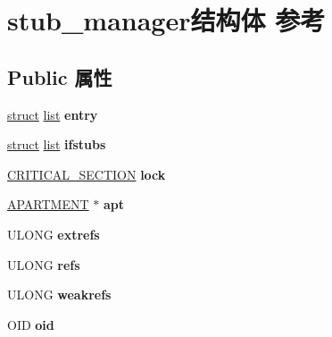 \hypertarget{structstub__manager}{}\section{stub\+\_\+manager结构体 参考}
\label{structstub__manager}
\subsection*{Public 属性}
\begin{DoxyCompactItemize}
\item 
\mbox{\label{structstub__manager_af73dcf9b53a5de15dfb5a33bc3ff68c3}} 
\hyperlink{interfacestruct}{struct} \hyperlink{classlist}{list} {\bfseries entry}
\item 
\mbox{\label{structstub__manager_aaf70f2ff9e0b6abd0137b964b416b8aa}} 
\hyperlink{interfacestruct}{struct} \hyperlink{classlist}{list} {\bfseries ifstubs}
\item 
\mbox{\label{structstub__manager_a12ebc9013564ec6394544b0598a1b834}} 
\hyperlink{struct___c_r_i_t_i_c_a_l___s_e_c_t_i_o_n}{C\+R\+I\+T\+I\+C\+A\+L\+\_\+\+S\+E\+C\+T\+I\+ON} {\bfseries lock}
\item 
\mbox{\label{structstub__manager_af2d6eb73011d8a0ad8e5c7c85a5d882d}} 
\hyperlink{structapartment}{A\+P\+A\+R\+T\+M\+E\+NT} $\ast$ {\bfseries apt}
\item 
\mbox{\label{structstub__manager_a0d5630daad21d9e80643a481bf518df5}} 
U\+L\+O\+NG {\bfseries extrefs}
\item 
\mbox{\label{structstub__manager_ac15b1a132c8174c22ebebc081fd73336}} 
U\+L\+O\+NG {\bfseries refs}
\item 
\mbox{\label{structstub__manager_ab1b115b90b24d5808065e258d574c088}} 
U\+L\+O\+NG {\bfseries weakrefs}
\item 
\mbox{\label{structstub__manager_a9735b57e17ccf80d74496bcd49d62c13}} 
O\+ID {\bfseries oid}
\item 
\mbox{\label{structstub__manager_a76d0d92ddf860d48fa1eef5b7595d095}} 

\end{DoxyCompactItemize}
